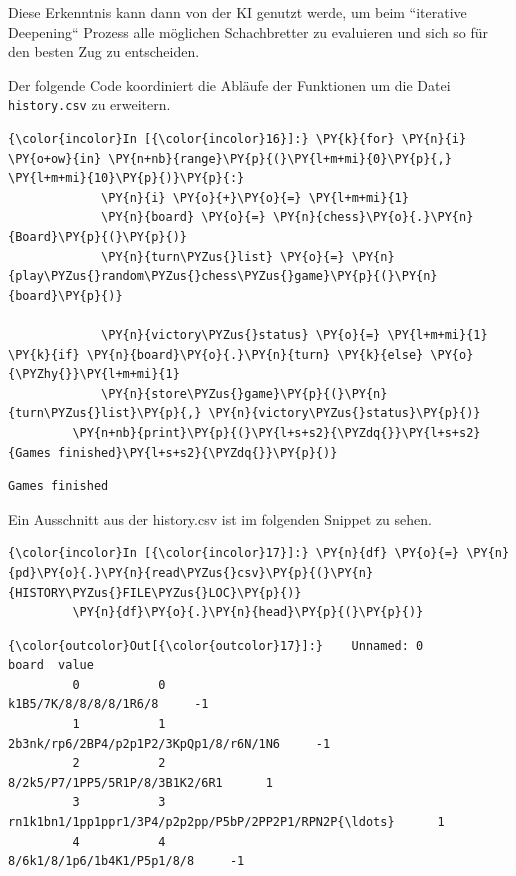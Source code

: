 Diese Erkenntnis kann dann von der KI genutzt werde, um beim ``iterative
Deepening`` Prozess alle möglichen Schachbretter zu evaluieren und sich
so für den besten Zug zu entscheiden.

Der folgende Code koordiniert die Abläufe der Funktionen um die Datei
\texttt{history.csv} zu erweitern.

    \begin{Verbatim}[commandchars=\\\{\}]
{\color{incolor}In [{\color{incolor}16}]:} \PY{k}{for} \PY{n}{i} \PY{o+ow}{in} \PY{n+nb}{range}\PY{p}{(}\PY{l+m+mi}{0}\PY{p}{,} \PY{l+m+mi}{10}\PY{p}{)}\PY{p}{:}
             \PY{n}{i} \PY{o}{+}\PY{o}{=} \PY{l+m+mi}{1}
             \PY{n}{board} \PY{o}{=} \PY{n}{chess}\PY{o}{.}\PY{n}{Board}\PY{p}{(}\PY{p}{)}
             \PY{n}{turn\PYZus{}list} \PY{o}{=} \PY{n}{play\PYZus{}random\PYZus{}chess\PYZus{}game}\PY{p}{(}\PY{n}{board}\PY{p}{)}
         
             \PY{n}{victory\PYZus{}status} \PY{o}{=} \PY{l+m+mi}{1} \PY{k}{if} \PY{n}{board}\PY{o}{.}\PY{n}{turn} \PY{k}{else} \PY{o}{\PYZhy{}}\PY{l+m+mi}{1}
             \PY{n}{store\PYZus{}game}\PY{p}{(}\PY{n}{turn\PYZus{}list}\PY{p}{,} \PY{n}{victory\PYZus{}status}\PY{p}{)}
         \PY{n+nb}{print}\PY{p}{(}\PY{l+s+s2}{\PYZdq{}}\PY{l+s+s2}{Games finished}\PY{l+s+s2}{\PYZdq{}}\PY{p}{)}
\end{Verbatim}


    \begin{Verbatim}[commandchars=\\\{\}]
Games finished

    \end{Verbatim}

    Ein Ausschnitt aus der history.csv ist im folgenden Snippet zu sehen.

    \begin{Verbatim}[commandchars=\\\{\}]
{\color{incolor}In [{\color{incolor}17}]:} \PY{n}{df} \PY{o}{=} \PY{n}{pd}\PY{o}{.}\PY{n}{read\PYZus{}csv}\PY{p}{(}\PY{n}{HISTORY\PYZus{}FILE\PYZus{}LOC}\PY{p}{)}
         \PY{n}{df}\PY{o}{.}\PY{n}{head}\PY{p}{(}\PY{p}{)}
\end{Verbatim}


\begin{Verbatim}[commandchars=\\\{\}]
{\color{outcolor}Out[{\color{outcolor}17}]:}    Unnamed: 0                                              board  value
         0           0                              k1B5/7K/8/8/8/8/1R6/8     -1
         1           1             2b3nk/rp6/2BP4/p2p1P2/3KpQp1/8/r6N/1N6     -1
         2           2                     8/2k5/P7/1PP5/5R1P/8/3B1K2/6R1      1
         3           3  rn1k1bn1/1pp1ppr1/3P4/p2p2pp/P5bP/2PP2P1/RPN2P{\ldots}      1
         4           4                         8/6k1/8/1p6/1b4K1/P5p1/8/8     -1
\end{Verbatim}
            
